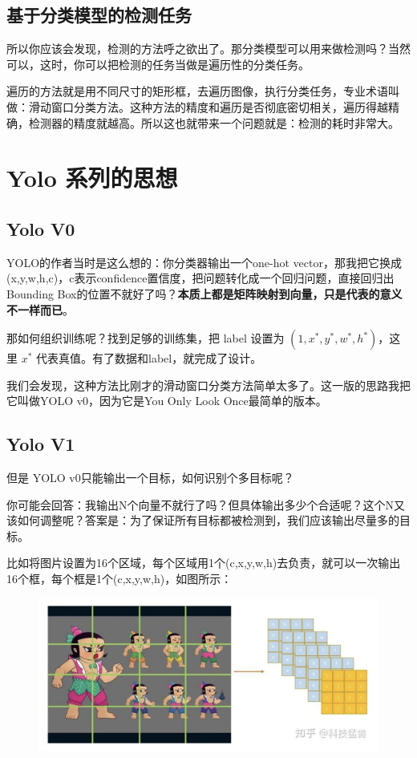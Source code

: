 \documentclass[12pt]{article}
\begin{document}
\subsection{基于分类模型的检测任务}
所以你应该会发现，检测的方法呼之欲出了。那分类模型可以用来做检测吗？当然可以，这时，你可以把检测的任务当做是遍历性的分类任务。

遍历的方法就是用不同尺寸的矩形框，去遍历图像，执行分类任务，专业术语叫做：滑动窗口分类方法。这种方法的精度和遍历是否彻底密切相关，遍历得越精确，检测器的精度就越高。所以这也就带来一个问题就是：检测的耗时非常大。

\section{Yolo 系列的思想}
\subsection{Yolo V0}
YOLO的作者当时是这么想的：你分类器输出一个one-hot vector，那我把它换成(x,y,w,h,c)，c表示confidence置信度，把问题转化成一个回归问题，直接回归出Bounding Box的位置不就好了吗？\textbf{本质上都是矩阵映射到向量，只是代表的意义不一样而已}。

那如何组织训练呢？找到足够的训练集，把 label 设置为 $(1, x^*, y^*, w^*, h^*)$，这里 $x^*$ 代表真值。有了数据和label，就完成了设计。

我们会发现，这种方法比刚才的滑动窗口分类方法简单太多了。这一版的思路我把它叫做YOLO v0，因为它是You Only Look Once最简单的版本。

\subsection{Yolo V1}
但是 YOLO v0只能输出一个目标，如何识别个多目标呢？

你可能会回答：我输出N个向量不就行了吗？但具体输出多少个合适呢？这个N又该如何调整呢？答案是：为了保证所有目标都被检测到，我们应该输出尽量多的目标。

比如将图片设置为16个区域，每个区域用1个(c,x,y,w,h)去负责，就可以一次输出16个框，每个框是1个(c,x,y,w,h)，如图所示：
\begin{figure}[H]
    \centering
    \includegraphics[width=.6\textwidth]{fig/Yolo_Series_1.png}
\end{figure}
\end{document}
